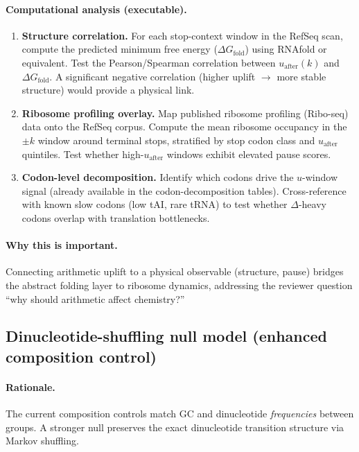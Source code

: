 \paragraph{Computational analysis (executable).}
\begin{enumerate}
\item \textbf{Structure correlation.}
For each stop-context window in the RefSeq scan, compute the predicted minimum free energy ($\Delta G_{\mathrm{fold}}$) using RNAfold or equivalent.
Test the Pearson/Spearman correlation between $u_{\mathrm{after}}(k)$ and $\Delta G_{\mathrm{fold}}$.
A significant negative correlation (higher uplift $\to$ more stable structure) would provide a physical link.
\item \textbf{Ribosome profiling overlay.}
Map published ribosome profiling (Ribo-seq) data onto the RefSeq corpus.
Compute the mean ribosome occupancy in the $\pm k$ window around terminal stops, stratified by stop codon class and $u_{\mathrm{after}}$ quintiles.
Test whether high-$u_{\mathrm{after}}$ windows exhibit elevated pause scores.
\item \textbf{Codon-level decomposition.}
Identify which codons drive the $u$-window signal (already available in the codon-decomposition tables).
Cross-reference with known slow codons (low tAI, rare tRNA) to test whether $\Delta$-heavy codons overlap with translation bottlenecks.
\end{enumerate}

\paragraph{Why this is important.}
Connecting arithmetic uplift to a physical observable (structure, pause) bridges the abstract folding layer to ribosome dynamics, addressing the reviewer question ``why should arithmetic affect chemistry?''

\subsection{Dinucleotide-shuffling null model (enhanced composition control)}
\label{app:bio_dinuc_shuffle}

\paragraph{Rationale.}
The current composition controls match GC and dinucleotide \emph{frequencies} between groups.
A stronger null preserves the exact dinucleotide transition structure via Markov shuffling.

